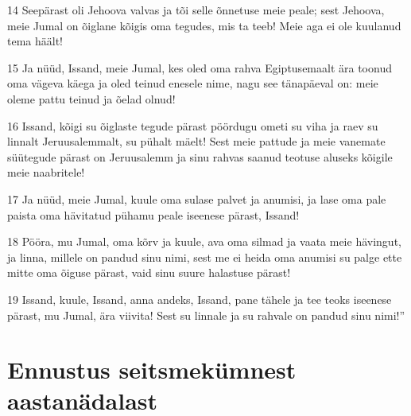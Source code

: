 \par 14 Seepärast oli Jehoova valvas ja tõi selle õnnetuse meie peale; sest Jehoova, meie Jumal on õiglane kõigis oma tegudes, mis ta teeb! Meie aga ei ole kuulanud tema häält!
\par 15 Ja nüüd, Issand, meie Jumal, kes oled oma rahva Egiptusemaalt ära toonud oma vägeva käega ja oled teinud enesele nime, nagu see tänapäeval on: meie oleme pattu teinud ja õelad olnud!
\par 16 Issand, kõigi su õiglaste tegude pärast pöördugu ometi su viha ja raev su linnalt Jeruusalemmalt, su pühalt mäelt! Sest meie pattude ja meie vanemate süütegude pärast on Jeruusalemm ja sinu rahvas saanud teotuse aluseks kõigile meie naabritele!
\par 17 Ja nüüd, meie Jumal, kuule oma sulase palvet ja anumisi, ja lase oma pale paista oma hävitatud pühamu peale iseenese pärast, Issand!
\par 18 Pööra, mu Jumal, oma kõrv ja kuule, ava oma silmad ja vaata meie hävingut, ja linna, millele on pandud sinu nimi, sest me ei heida oma anumisi su palge ette mitte oma õiguse pärast, vaid sinu suure halastuse pärast!
\par 19 Issand, kuule, Issand, anna andeks, Issand, pane tähele ja tee teoks iseenese pärast, mu Jumal, ära viivita! Sest su linnale ja su rahvale on pandud sinu nimi!”
\section*{Ennustus seitsmekümnest aastanädalast}

